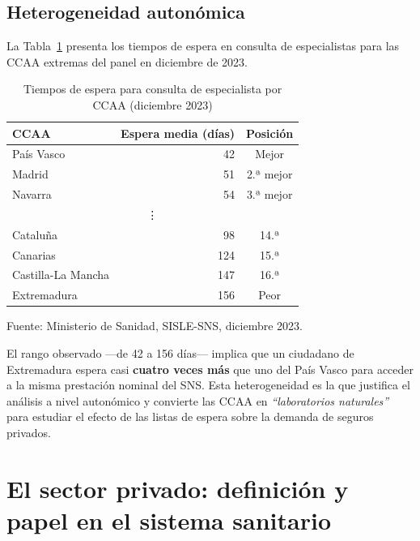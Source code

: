 \subsection{Heterogeneidad autonómica}

La Tabla~\ref{tab:espera_ccaa} presenta los tiempos de espera en consulta de
especialistas para las CCAA extremas del panel en diciembre de 2023.

\begin{table}[htbp]
  \centering
  \caption{Tiempos de espera para consulta de especialista por CCAA (diciembre 2023)}
  \label{tab:espera_ccaa}
  \begin{threeparttable}
    \begin{tabular}{lrc}
      \toprule
      \textbf{CCAA} & \textbf{Espera media (días)} & \textbf{Posición} \\
      \midrule
      País Vasco         &  42 & Mejor \\
      Madrid             &  51 & 2.ª mejor \\
      Navarra            &  54 & 3.ª mejor \\
      \multicolumn{3}{c}{\vdots} \\
      Cataluña           &  98 & 14.ª \\
      Canarias           & 124 & 15.ª \\
      Castilla-La Mancha & 147 & 16.ª \\
      Extremadura        & 156 & Peor \\
      \bottomrule
    \end{tabular}
    \begin{tablenotes}[flushleft]
      \footnotesize
      \item Fuente: Ministerio de Sanidad, SISLE-SNS, diciembre 2023.
    \end{tablenotes}
  \end{threeparttable}
\end{table}

El rango observado ---de 42 a 156 días--- implica que un ciudadano de Extremadura
espera casi \textbf{cuatro veces más} que uno del País Vasco para acceder a la
misma prestación nominal del SNS. Esta heterogeneidad es la que justifica el
análisis a nivel autonómico y convierte las CCAA en \textit{``laboratorios
naturales''} para estudiar el efecto de las listas de espera sobre la demanda de
seguros privados.

\section{El sector privado: definición y papel en el sistema sanitario}

